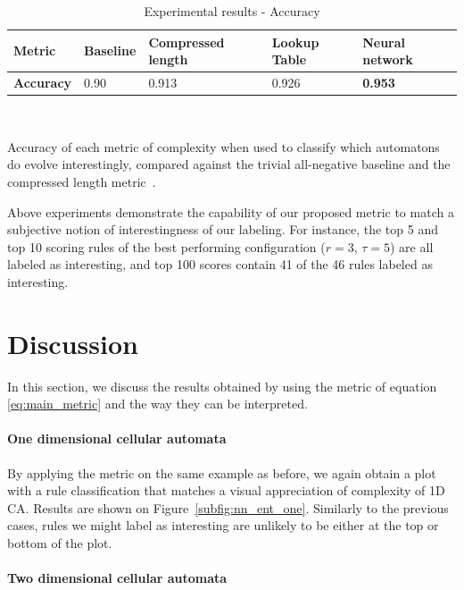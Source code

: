 \begin{table}[t!]
  \renewcommand{\arraystretch}{1.2}
  \caption{Experimental results - Accuracy}
  \label{experiments_table2}
  \centering
  \begin{tabular}{lm{.1\linewidth}m{.16\linewidth}m{.1\linewidth}m{.11\linewidth}}
    \toprule
    \bfseries  Metric & Baseline & Compressed length
    \parencite{zenil_compression-based_2010} &
    Lookup Table & Neural network \\ \midrule
    \bfseries Accuracy & 0.90 & 0.913 & 0.926 & \bfseries 0.953 \\ \bottomrule
  \end{tabular}
  \\[+8pt]
  \begin{flushleft}{\footnotesize Accuracy of each metric of complexity when
      used to classify which automatons do evolve interestingly, compared
      against the trivial all-negative baseline and the compressed length
      metric~\parencite{zenil_compression-based_2010}.}\end{flushleft}
\end{table}

Above experiments demonstrate the capability of our proposed metric to match a
subjective notion of interestingness of our labeling. For instance, the top 5
and top 10 scoring rules of the best performing configuration ($r=3$, $\tau =
5$) are all labeled as interesting, and top 100 scores contain 41 of the 46
rules labeled as interesting.

\section{Discussion}

In this section, we discuss the results obtained by using the metric of equation
\eqref{eq:main_metric} and the way they can be interpreted.

\paragraph{One dimensional cellular automata}
By applying the metric on the same example as before, we again obtain a
plot with a rule classification that matches a visual appreciation of
complexity of 1D CA. Results are shown on Figure~\ref{subfig:nn_ent_one}.
Similarly to the previous cases, rules we might label as interesting are
unlikely to be either at the top or bottom of the plot.

\paragraph{Two dimensional cellular automata}


